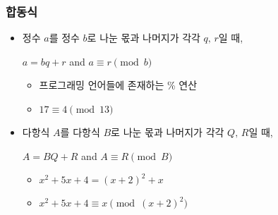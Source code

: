 \begin{frame}
    \frametitle{합동식}
    \begin{itemize}
        \setlength{\itemsep}{2em}
        \item 정수 \(a\)를 정수 \(b\)로 나눈 몫과 나머지가 각각 \(q,\,r\)일 때,
              \smallskip
              \begin{center}
                  \(a = bq + r\) \quad and \quad \(a \equiv r \pmod{b}\)
              \end{center}
              \smallskip
              \begin{itemize}
                  \item 프로그래밍 언어들에 존재하는 \textsc{\%} 연산
                        \medskip
                  \item \(17 \equiv 4 \pmod{13}\)
              \end{itemize}
        \item<2-> 다항식 \(A\)를 다항식 \(B\)로 나눈 몫과 나머지가 각각 \(Q,\,R\)일 때,
              \smallskip
              \begin{center}
                  \(A = BQ + R\) \quad and \quad \(A \equiv R \pmod{B}\)
              \end{center}
              \smallskip
              \begin{itemize}
                  \item<3-> \(x^2 + 5x + 4 = (x + 2)^2 + x\)
                        \medskip
                  \item<3-> \(x^2 + 5x + 4 \equiv x \pmod{(x + 2)^2}\)
              \end{itemize}
    \end{itemize}
\end{frame}
